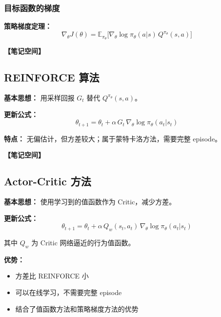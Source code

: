 \documentclass[12pt,a4paper]{article}
\newcommand{\notespace}[1][3cm]{%
  \vspace{#1}%
  \noindent\textbf{【笔记空间】}%
  \vspace{#1}%
}
\newcommand{\E}{\mathbb{E}}
\newcommand{\1}{\mathbf{1}}
\begin{document}
\subsubsection*{目标函数的梯度}

\begin{keybox}
\textbf{策略梯度定理：}
\begin{equation}
\nabla_\theta J(\theta)=\E_{\pi_\theta}\bigl[\nabla_\theta\log\pi_\theta(a|s)\,Q^{\pi_\theta}(s,a)\bigr]
\end{equation}
\end{keybox}

\notespace[2cm]

\subsection{REINFORCE 算法}

\textbf{基本思想：} 用采样回报 $G_t$ 替代 $Q^{\pi_\theta}(s,a)$。

\textbf{更新公式：}
\begin{equation}
\theta_{t+1}=\theta_t+\alpha\,G_t\,\nabla_\theta\log\pi_\theta(a_t|s_t)
\end{equation}

\begin{notebox}
\textbf{特点：} 无偏估计，但方差较大；属于蒙特卡洛方法，需要完整 episode。
\end{notebox}

\notespace[2cm]

\subsection{Actor-Critic 方法}

\textbf{基本思想：} 使用学习到的值函数作为 Critic，减少方差。

\textbf{更新公式：}
\begin{equation}
\theta_{t+1}=\theta_t+\alpha\,Q_w(s_t,a_t)\,\nabla_\theta\log\pi_\theta(a_t|s_t)
\end{equation}

其中 $Q_w$ 为 Critic 网络逼近的行为值函数。

\begin{keybox}
\textbf{优势：}
\begin{itemize}[leftmargin=1.5em]
  \item 方差比 REINFORCE 小
  \item 可以在线学习，不需要完整 episode
  \item 结合了值函数方法和策略梯度方法的优势
\end{itemize}
\end{keybox}
\end{document}
